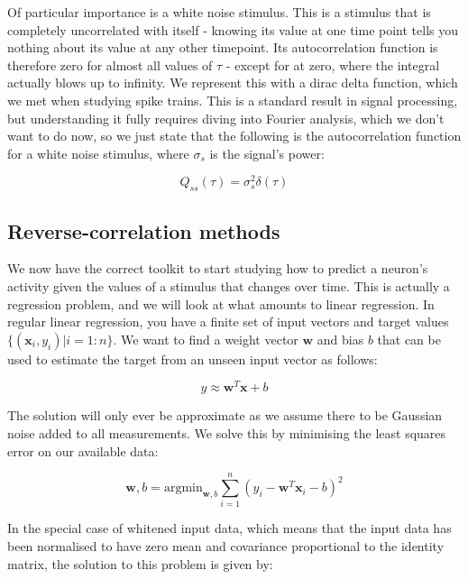 \documentclass{article}
\begin{document}
Of particular importance is a white noise stimulus. This is a stimulus that is completely uncorrelated with itself - knowing its value at one time point tells you nothing about its value at any other timepoint. Its autocorrelation function is therefore zero for almost all values of $\tau$ - except for at zero, where the integral actually blows up to infinity. We represent this with a dirac delta function, which we met when studying spike trains. This is a standard result in signal processing, but understanding it fully requires diving into Fourier analysis, which we don't want to do now, so we just state that the following is the autocorrelation function for a white noise stimulus, where $\sigma_s$ is the signal's power:

\begin{equation*}
    Q_{ss}(\tau) = \sigma_s^2 \delta(\tau)
\end{equation*}

\subsection{Reverse-correlation methods}

We now have the correct toolkit to start studying how to predict a neuron's activity given the values of a stimulus that changes over time. This is actually a regression problem, and we will look at what amounts to linear regression. In regular linear regression, you have a finite set of input vectors and target values $\{(\bm{x}_i, y_i) | i=1:n\}$. We want to find a weight vector $\bm{w}$ and bias $b$ that can be used to estimate the target from an unseen input vector as follows:

\begin{equation*}
    y \approx \bm{w}^T\bm{x} + b
\end{equation*}

The solution will only ever be approximate as we assume there to be Gaussian noise added to all measurements. We solve this by minimising the least squares error on our available data:

\begin{equation*}
    \bm{w}, b = \text{argmin}_{\bm{w},b} \sum_{i=1}^n (y_i - \bm{w}^T\bm{x}_i - b)^2
\end{equation*}

In the special case of whitened input data, which means that the input data has been normalised to have zero mean and covariance proportional to the identity matrix, the solution to this problem is given by:
\end{document}
